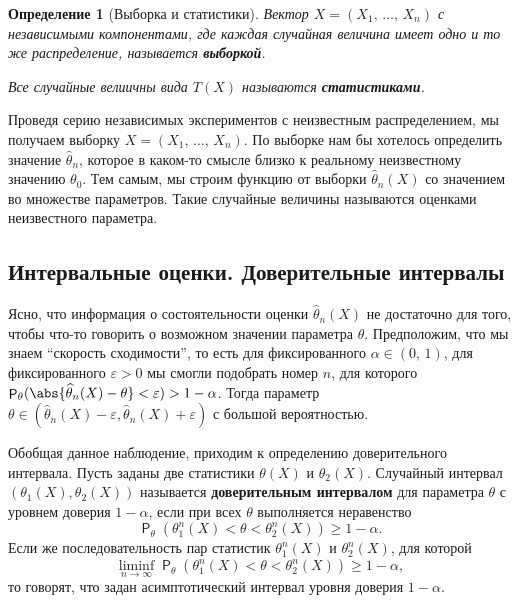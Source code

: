 \documentclass[12pt]{article}
\DeclareMathOperator{\prob}{\mathsf{P}}
\renewcommand{\geq}{\geqslant}
\newtheorem*{definition*}{Определение}
\begin{document}
    \begin{definition*}[Выборка и статистики]
        Вектор $X = (X_1,\,\ldots,\,X_n)$ с независимыми компонентами, где каждая случайная величина имеет одно и то же распределение, называется \textbf{выборкой}.

        Все случайные велиичны вида $T(X)$ называются \textbf{статистиками}.
    \end{definition*}

    Проведя серию независимых экспериментов с неизвестным распределением, мы получаем выборку $X = (X_1,\,\ldots,\,X_n)$. По выборке нам бы хотелось определить значение $\widehat{\theta}_n$, которое в каком-то смысле близко к реальному неизвестному значению $\theta_0$. Тем самым, мы строим функцию от выборки $\widehat{\theta}_n(X)$ со значением во множестве параметров. Такие случайные величины называются оценками неизвестного параметра.

    \subsection{Интервальные оценки. Доверительные интервалы}
    Ясно, что информация о состоятельности оценки $\widehat{\theta}_n(X)$ не достаточно для того, чтобы что-то говорить о возможном значении параметра $\theta$. Предположим, что мы знаем ``скорость сходимости'', то есть для фиксированного $\alpha \in (0,\, 1)$, для фиксированного $\varepsilon > 0$ мы смогли подобрать номер $n$, для которого $\prob_\theta (\abs{\widehat{\theta}_n(X) - \theta} < \varepsilon) > 1 - \alpha$. Тогда параметр $\theta \in (\widehat{\theta}_n(X) - \varepsilon, \widehat{\theta}_n(X) + \varepsilon)$ с большой вероятностью.

    Обобщая данное наблюдение, приходим к определению доверительного интервала. Пусть заданы две статистики $\theta(X)$ и $\theta_2(X)$. Случайный интервал $(\theta_1(X), \theta_2(X))$ называется \textbf{доверительным интервалом} для параметра $\theta$ с уровнем доверия $1 - \alpha$, если при всех $\theta$ выполняется неравенство
    \begin{equation*}
        \prob_\theta(\theta_1^n(X) < \theta < \theta_2^n(X)) \geq 1 - \alpha.
    \end{equation*}
    Если же последовательность пар статистик $\theta_1^n(X)$ и $\theta_2^n(X)$, для которой
    \begin{equation*}
        \liminf_{n \to \infty} \prob_\theta(\theta_1^n(X) < \theta < \theta_2^n(X)) \geq 1 - \alpha,
    \end{equation*}
    то говорят, что задан асимптотический интервал уровня доверия $1 - \alpha$.
\end{document}
